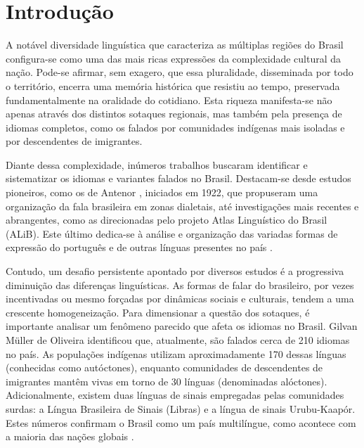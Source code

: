  \chapter{Introdução} %

\begin{flushleft}


A notável diversidade linguística que caracteriza as múltiplas regiões do Brasil configura-se como uma das mais ricas expressões da complexidade cultural da nação. Pode-se afirmar, sem exagero, que essa pluralidade, disseminada por todo o território, encerra uma memória histórica que resistiu ao tempo, preservada fundamentalmente na oralidade do cotidiano. Esta riqueza manifesta-se não apenas através dos distintos sotaques regionais, mas também pela presença de idiomas completos, como os falados por comunidades indígenas mais isoladas e por descendentes de imigrantes.

Diante dessa complexidade, inúmeros trabalhos buscaram identificar e sistematizar os idiomas e variantes falados no Brasil. Destacam-se desde estudos pioneiros, como os de Antenor \cite{nascentes1953}, iniciados em 1922, que propuseram uma organização da fala brasileira em zonas dialetais, até investigações mais recentes e abrangentes, como as direcionadas pelo projeto Atlas Linguístico do Brasil (ALiB). Este último dedica-se à análise e organização das variadas formas de expressão do português e de outras línguas presentes no país \cite{cardoso2014alib, Aguilera2022}.

Contudo, um desafio persistente apontado por diversos estudos é a progressiva diminuição das diferenças linguísticas. As formas de falar do brasileiro, por vezes incentivadas ou mesmo forçadas por dinâmicas sociais e culturais, tendem a uma crescente homogeneização. Para dimensionar a questão dos sotaques, é importante analisar um fenômeno parecido que afeta os idiomas no Brasil. Gilvan Müller de Oliveira identificou que, atualmente, são falados cerca de 210 idiomas no país. As populações indígenas utilizam aproximadamente 170 dessas línguas (conhecidas como autóctones), enquanto comunidades de descendentes de imigrantes mantêm vivas em torno de 30 línguas (denominadas alóctones). Adicionalmente, existem duas línguas de sinais empregadas pelas comunidades surdas: a Língua Brasileira de Sinais (Libras) e a língua de sinais Urubu-Kaapór. Estes números confirmam o Brasil como um país multilíngue, como acontece com a maioria das nações globais \cite{noauthor_plurilinguismo_nodate}.


\end{flushleft}
